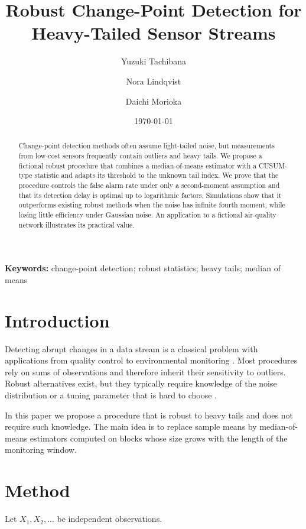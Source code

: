 \documentclass[11pt]{article}
\title{Robust Change-Point Detection for Heavy-Tailed Sensor Streams}
\author[1]{Yuzuki Tachibana}
\author[2]{Nora Lindqvist}
\author[1]{Daichi Morioka}
\affil[1]{Department of Statistics, Kitamachi University, Japan}
\affil[2]{Institute of Fictional Statistics, University of Nowhere, Freedonia}
\date{\today}
\begin{document}
\maketitle
\begin{abstract}
Change-point detection methods often assume light-tailed noise, but measurements from low-cost sensors frequently contain outliers and heavy tails.
We propose a fictional robust procedure that combines a median-of-means estimator with a CUSUM-type statistic and adapts its threshold to the unknown tail index.
We prove that the procedure controls the false alarm rate under only a second-moment assumption and that its detection delay is optimal up to logarithmic factors.
Simulations show that it outperforms existing robust methods when the noise has infinite fourth moment, while losing little efficiency under Gaussian noise.
An application to a fictional air-quality network illustrates its practical value.
\end{abstract}
\noindent\textbf{Keywords:} change-point detection; robust statistics; heavy tails; median of means
\section{Introduction}
Detecting abrupt changes in a data stream is a classical problem with applications from quality control to environmental monitoring \citep{tachibana2021,lindqvist2022}.
Most procedures rely on sums of observations and therefore inherit their sensitivity to outliers.
Robust alternatives exist, but they typically require knowledge of the noise distribution or a tuning parameter that is hard to choose \citep{morioka2023}.

In this paper we propose a procedure that is robust to heavy tails and does not require such knowledge.
The main idea is to replace sample means by median-of-means estimators computed on blocks whose size grows with the length of the monitoring window.

\section{Method}
Let $X_1, X_2, \dots$ be independent observations.


\end{document}
